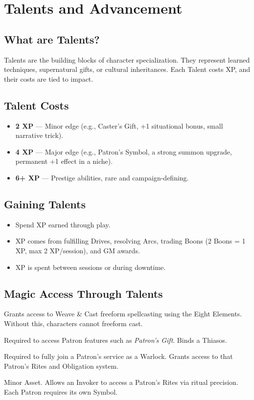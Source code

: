 

\section{Talents and Advancement}

\subsection{What are Talents?}
Talents are the building blocks of character specialization. They represent learned techniques, supernatural gifts, or cultural inheritances. 
Each Talent costs XP, and their costs are tied to impact.

\subsection{Talent Costs}
\begin{itemize}
  \item \textbf{2 XP} — Minor edge (e.g., Caster’s Gift, +1 situational bonus, small narrative trick).
  \item \textbf{4 XP} — Major edge (e.g., Patron’s Symbol, a strong summon upgrade, permanent +1 effect in a niche).
  \item \textbf{6+ XP} — Prestige abilities, rare and campaign-defining.
\end{itemize}

\subsection{Gaining Talents}
\begin{itemize}
  \item Spend XP earned through play. 
  \item XP comes from fulfilling Drives, resolving Arcs, trading Boons (2 Boons = 1 XP, max 2 XP/session), and GM awards.
  \item XP is spent between sessions or during downtime.
\end{itemize}

\subsection{Magic Access Through Talents}
\begin{description}[leftmargin=1.5em, style=nextline]
  \item[Caster’s Gift (2 XP):] Grants access to Weave \& Cast freeform spellcasting using the Eight Elements. Without this, characters cannot freeform cast.
  \item[Familiar (2 XP):] Required to access Patron features such as \emph{Patron’s Gift}. Binds a Thiasos.
  \item[Codex (4 XP):] Required to fully join a Patron’s service as a Warlock. Grants access to that Patron’s Rites and Obligation system.
  \item[Patron’s Symbol (4 XP):] Minor Asset. Allows an Invoker to access a Patron’s Rites via ritual precision. Each Patron requires its own Symbol.
\end{description}

